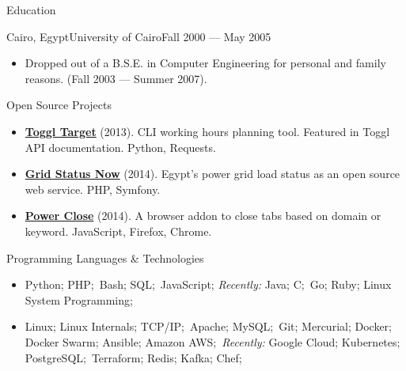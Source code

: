\documentclass[]{mosabcv}
\begin{document}
\begin{cvsection}{Education}
  \begin{cvsubsection}{Cairo, Egypt}{University of Cairo}{Fall 2000 --- May
    2005}
    \begin{itemize}
      \item Dropped out of a B.S.E. in Computer Engineering for personal and
        family reasons. (Fall 2003 --- Summer 2007).
    \end{itemize}
  \end{cvsubsection}
\end{cvsection}

\begin{cvsection}{Open Source Projects}
  \begin{cvsubsection}{}{}{}
    \begin{itemize}
      \item \textbf{\href{https://github.com/mos3abof/toggl_target}{Toggl
        Target}} (2013). CLI working hours planning tool. Featured in Toggl API
        documentation. Python, Requests.
      \item \textbf{\href{https://www.gridstatusnow.com}{Grid Status Now}}
        (2014). Egypt's power grid load status as an open source web service.
        PHP, Symfony.
      \item \textbf{\href{https://power-close.com/}{Power Close}} (2014). A
        browser addon to close tabs based on domain or keyword. JavaScript,
        Firefox, Chrome.
    \end{itemize}
  \end{cvsubsection}
\end{cvsection}

\begin{cvsection}{Programming Languages \& Technologies}
  \begin{cvsubsection}{}{}{}
    \begin{itemize}
      \item Python; PHP;\ Bash; SQL;\ JavaScript; \textit{Recently:} Java; C;\
        Go; Ruby; Linux System Programming;
      \item Linux; Linux Internals; TCP/IP;\ Apache; MySQL;\ Git; Mercurial;
        Docker; Docker Swarm; Ansible; Amazon AWS;\ \textit{Recently:}
        Google Cloud; Kubernetes; PostgreSQL;\ Terraform; Redis; Kafka;
        Chef;
    \end{itemize}
  \end{cvsubsection}
\end{cvsection}
\end{document}
